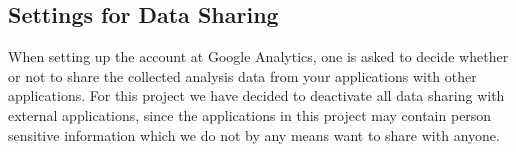 \subsection{Settings for Data Sharing}
When setting up the account at Google Analytics, one is asked to decide whether or not to share the collected analysis data from your applications with other applications.
For this project we have decided to deactivate all data sharing with external applications, since the applications in this project may contain person sensitive information which we do not by any means want to share with anyone.

%
